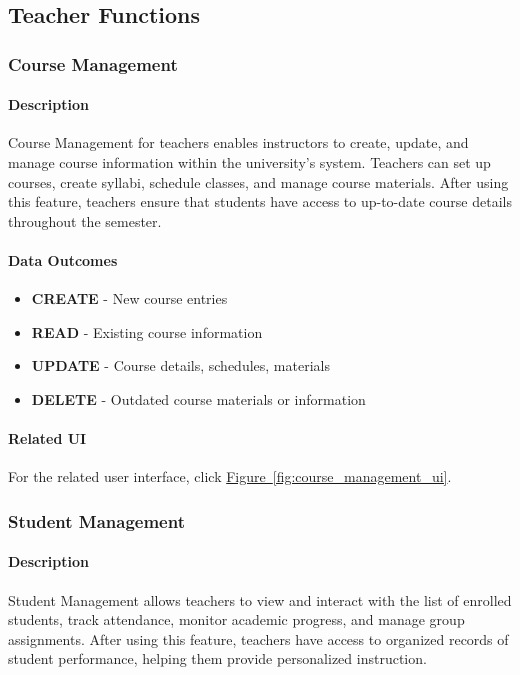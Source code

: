 \documentclass[12pt]{article}
\begin{document}
\subsection{Teacher Functions}
\subsubsection{Course Management}

\paragraph{Description}
Course Management for teachers enables instructors to create, update, and manage course information within the university's system. Teachers can set up courses, create syllabi, schedule classes, and manage course materials. After using this feature, teachers ensure that students have access to up-to-date course details throughout the semester.

\paragraph{Data Outcomes}
\begin{itemize}
    \item \textbf{CREATE} - New course entries
    \item \textbf{READ} - Existing course information
    \item \textbf{UPDATE} - Course details, schedules, materials
    \item \textbf{DELETE} - Outdated course materials or information
\end{itemize}

\paragraph{Related UI}
For the related user interface, click \hyperref[fig:course_management_ui]{Figure~\ref*{fig:course_management_ui}}.

\subsubsection{Student Management}

\paragraph{Description}
Student Management allows teachers to view and interact with the list of enrolled students, track attendance, monitor academic progress, and manage group assignments. After using this feature, teachers have access to organized records of student performance, helping them provide personalized instruction.
\end{document}
